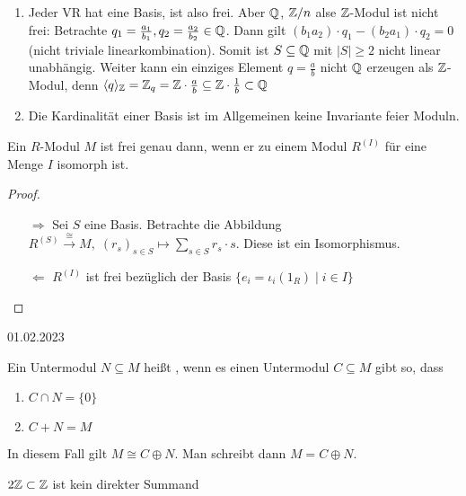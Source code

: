 \documentclass[../main.tex]{subfiles}
\begin{document}
\begin{remark}$ $
    \begin{enumerate}[label=\alph*)]
        \item Jeder VR hat eine Basis, ist also frei.
        Aber $\mathbb{Q}$, $\mathbb{Z}/n$ alse $\mathbb{Z}$-Modul ist nicht frei:
        Betrachte $q_1 = \frac{a_1}{b_1},q_2=\frac{a_2}{b_2}\in \mathbb{Q}$. Dann gilt $(b_1a_2)\cdot q_1 - (b_2a_1)\cdot q_2 = 0$ (nicht triviale linearkombination).
        Somit ist $S\subseteq \mathbb{Q}$ mit $|S|\geq 2$ nicht linear unabhängig.
        Weiter kann ein einziges Element $q=\frac{a}{b}$ nicht $\mathbb{Q}$ erzeugen als $\mathbb{Z}$-Modul, denn $\langle q\rangle_{\mathbb{Z}} = \mathbb{Z}_q = \mathbb{Z}\cdot \frac{a}{b}\subseteq \mathbb{Z}\cdot \frac{1}{b} \subset \mathbb{Q}$
        \item Die Kardinalität einer Basis ist im Allgemeinen keine Invariante feier Moduln.
    \end{enumerate}
\end{remark}

\begin{lemma}
    Ein $R$-Modul $M$ ist frei genau dann, wenn er zu einem Modul $R^{(I)}$ für eine Menge $I$ isomorph ist.
\end{lemma}
\begin{proof} $ $
    \begin{itemize}
        \item[$\Rightarrow$]
        Sei $S$ eine Basis. Betrachte die Abbildung $R^{(S)}\overset{\cong}{\rightarrow} M,\; (r_s)_{s\in S} \mapsto \sum_{s\in S} r_s\cdot s$. Diese ist ein Isomorphismus.
        \item[$\Leftarrow$]
        $R^{(I)}$ ist frei bezüglich der Basis $\{e_i =\iota_i(1_R)\mid i\in I\}$
    \end{itemize}
\end{proof}

\begin{flushright}
    01.02.2023
\end{flushright}
\begin{definition}
    Ein Untermodul $N\subseteq M$ heißt , wenn es einen Untermodul $C\subseteq M$ gibt so, dass
    \begin{enumerate}[label=(\roman*)]
        \item $C\cap N = \{0\}$
        \item $C+N=M$
    \end{enumerate}
    In diesem Fall gilt $M\cong C\oplus N$.
    Man schreibt dann $M=C \oplus N$.
\end{definition}
\begin{example*}
    $2\mathbb{Z} \subset \mathbb{Z}$ ist kein direkter Summand
\end{example*}
\end{document}
